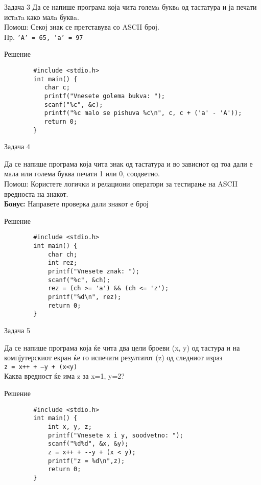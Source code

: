 \begin{frame}[fragile]{Задача 3}
Да се напише програма која чита големa буквa од тастатура и ја печати истaтa како малa буквa.\\
Помош: Секој знак се претставува со ASCII број.\\
Пр. \texttt{'А' = 65, 'а' = 97}
	\begin{exampleblock}{Решение}
		\begin{lstlisting}
		#include <stdio.h>
		int main() {
		   char c;
		   printf("Vnesete golema bukva: ");
		   scanf("%c", &c);
		   printf("%c malo se pishuva %c\n", c, c + ('a' - 'A'));
		   return 0;
		}
		\end{lstlisting}
	\end{exampleblock}
\end{frame}

\begin{frame}[fragile]{Задача 4}
\begin{scriptsize}
Да се напише програма која чита знак од тастатура и во зависнот од тоа дали е мала или голема буква печати 1 или 0, соодветно.\\
Помош: Користете логички и релациони оператори за тестирање на ASCII вредноста на знакот.\\
\textbf{Бонус:} Направете проверка дали знакот е број	
\end{scriptsize}
\begin{exampleblock}{Решение}
		\begin{lstlisting}
		#include <stdio.h>
		int main() {
		    char ch;
		    int rez;
		    printf("Vnesete znak: ");
		    scanf("%c", &ch);
		    rez = (ch >= 'a') && (ch <= 'z');
		    printf("%d\n", rez);
		    return 0;
		}
		\end{lstlisting}
	\end{exampleblock}
\end{frame}

\begin{frame}[fragile]{Задача 5}
\begin{scriptsize}
Да се напише програма која ќе чита два цели броеви (x, y) од тастура и на компјутерскиот екран ќе го испечати резултатот (z) од следниот израз\\
\texttt{z = x++ + --y + (x<y)}\\
Каква вредност ќе има z за x=1, y=2?
\end{scriptsize}
	\begin{exampleblock}{Решение}
		\begin{lstlisting}
		#include <stdio.h>
		int main() {
		    int x, y, z;
		    printf("Vnesete x i y, soodvetno: ");
		    scanf("%d%d", &x, &y);
		    z = x++ + --y + (x < y);
		    printf("z = %d\n",z);
		    return 0;
		}
		\end{lstlisting}
	\end{exampleblock}
\end{frame}

